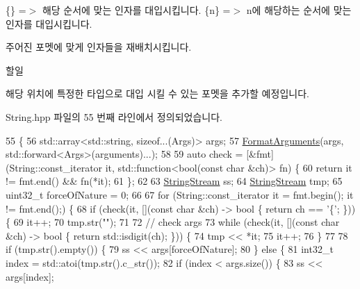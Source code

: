 \{\} =$>$ 해당 순서에 맞는 인자를 대입시킵니다. \{n\} =$>$ n에 해당하는 순서에 맞는 인자를 대입시킵니다. 

주어진 포멧에 맞게 인자들을 재배치시킵니다. \begin{DoxyRefDesc}{할일}
\item[\hyperlink{todo__todo000002}{할일}]해당 위치에 특정한 타입으로 대입 시킬 수 있는 포멧을 추가할 예정입니다. \end{DoxyRefDesc}


String.\+hpp 파일의 55 번째 라인에서 정의되었습니다.


\begin{DoxyCode}
55                                                                     \{
56             std::array<std::string, \textcolor{keyword}{sizeof}...(Args)> args;
57             \hyperlink{classcpf_1_1_string_util_af6a0483e9f189a49f9f25a6ca74d94a2}{FormatArguments}(args, std::forward<Args>(arguments)...);
58 
59             \textcolor{keyword}{auto} check = [&fmt](String::const\_iterator it, std::function<bool(const char &ch)> fn) \{
60                 \textcolor{keywordflow}{return} it != fmt.end() && fn(*it);
61             \};
62 
63             \hyperlink{namespacecpf_a6e5583a51165e808f1a480563a2d98b2}{StringStream} ss;
64             \hyperlink{namespacecpf_a6e5583a51165e808f1a480563a2d98b2}{StringStream} tmp;
65             uint32\_t forceOfNature = 0;
66 
67             \textcolor{keywordflow}{for} (String::const\_iterator it = fmt.begin(); it != fmt.end();) \{
68                 \textcolor{keywordflow}{if} (check(it, [](\textcolor{keyword}{const} \textcolor{keywordtype}{char} &ch) -> \textcolor{keywordtype}{bool} \{ \textcolor{keywordflow}{return} ch == \textcolor{charliteral}{'\{'}; \})) \{
69                     it++;
70                     tmp.str(\textcolor{stringliteral}{""});
71 
72                     \textcolor{comment}{// check args}
73                     \textcolor{keywordflow}{while} (check(it, [](\textcolor{keyword}{const} \textcolor{keywordtype}{char} &ch) -> \textcolor{keywordtype}{bool} \{ \textcolor{keywordflow}{return} std::isdigit(ch); \})) \{
74                         tmp << *it;
75                         it++;
76                     \}
77 
78                     \textcolor{keywordflow}{if} (tmp.str().empty()) \{
79                         ss << args[forceOfNature];
80                     \} \textcolor{keywordflow}{else} \{
81                         int32\_t index = std::atoi(tmp.str().c\_str());
82                         \textcolor{keywordflow}{if} (index < args.size()) \{
83                             ss << args[index];

\end{DoxyCode}
